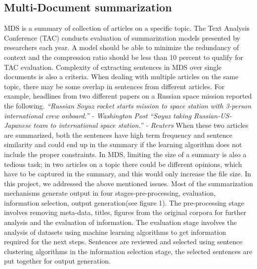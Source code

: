\subsection{Multi-Document summarization}
MDS is a summary of collection of articles on a specific topic. The Text Analysis Conference (TAC) conducts evaluation of summarization
models presented by researchers each year. A model should be able to minimize the redundancy of context and the compression
ratio should be less than 10 percent to qualify for TAC evaluation. Complexity of extracting sentences in MDS over single documents
is also a criteria. When dealing with multiple articles on  the same topic, there may be some overlap in 
sentences from different articles. For example, headlines from two different papers on a Russian space mission reported the following.
\newline\textit{``Russian Soyuz rocket starts mission to space station with 3-person international crew onboard.'' - Washington Post}
\newline\textit{``Soyuz taking Russian-US-Japanese team to international space station.'' - Reuters}\newline
When these two articles are summarized, both the sentences have high term frequency and sentence similarity and could
end up in the summary if the learning algorithm does not include the proper constraints.
In MDS, limiting the size of a summary is also a tedious task; in two articles on a topic there could be different opinions, 
which have to be captured in the summary, and this would only increase the file size. In this project, we addressed the above mentioned issues.
\newline Most of the summarization mechanisms generate output in four stages-pre-processing, evaluation, information
selection, output generation(see figure 1).
The pre-processing stage involves removing meta-data, titles, figures from the original corpora for further analysis and
the evaluation of information. The evaluation stage involves the analysis of datasets using machine learning algorithms to get information
required for the next steps. Sentences are reviewed and selected using sentence clustering algorithms in the information selection stage,
the selected sentences are put together for output generation.
